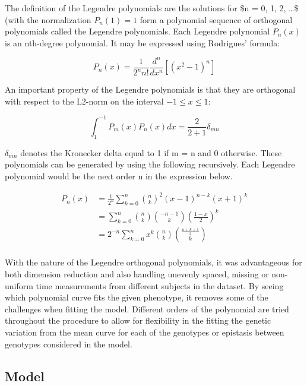 \documentclass[11pt,]{book}
\theoremstyle{definition}
\theoremstyle{definition}
\theoremstyle{remark}
\begin{document}
The definition of the Legendre polynomials are the solutions for \$n =
0, 1, 2, \dots \$ (with the normalization \(P_n(1) = 1\) form a
polynomial sequence of orthogonal polynomials called the Legendre
polynomials. Each Legendre polynomial \(P_n(x)\) is an nth-degree
polynomial. It may be expressed using Rodrigues' formula:

\begin{equation}
P_n(x) = \frac{1}{2^nn!} \frac{d^n}{dx^n}[(x^2-1)^n]
\label{eq:rodrigues-formula}
\end{equation}

An important property of the Legendre polynomials is that they are
orthogonal with respect to the L2-norm on the interval
\(−1 \le x \le 1\):

\begin{equation}
\int_1^{-1} P_m(x)P_n(x)dx = \frac{2}{2+1}\delta_{mn}
\label{eq:orthg-leg}
\end{equation}

\(\delta_{mn}\) denotes the Kronecker delta equal to 1 if m = n and 0
otherwise. These polynomials can be generated by using the following
recursively. Each Legendre polynomial would be the next order n in the
expression below.

\begin{equation}
\begin{split}
P_n(x) & = \frac{1}{2^n}\sum_{k=0}^{n}{{n}\choose{k}}^2(x-1)^{n-k}(x+1)^k \\
& = \sum_{k=0}^{n}{{n}\choose{k}}{{-n-1}\choose{k}}{\left(\frac{1-x}{2}\right)}^k \\
& = 2^{-n}\sum_{k=0}^{n} x^k {{n}\choose{k}}{{\frac{n+k+1}{2}}\choose{k}} \\
\end{split}
\label{eq:leg-eq}
\end{equation}

With the nature of the Legendre orthogonal polynomials, it was
advantageous for both dimension reduction and also handling unevenly
spaced, missing or non-uniform time measurements from different subjects
in the dataset. By seeing which polynomial curve fits the given
phenotype, it removes some of the challenges when fitting the model.
Different orders of the polynomial are tried throughout the procedure to
allow for flexibility in the fitting the genetic variation from the mean
curve for each of the genotypes or epistasis between genotypes
considered in the model.

\subsection{Model}\label{model}
\end{document}
